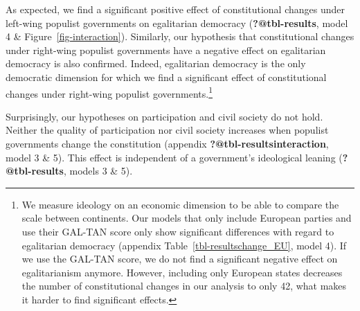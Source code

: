 \documentclass[
  abstract]{article}
\begin{document}
As expected, we find a significant positive effect of constitutional
changes under left-wing populist governments on egalitarian democracy
(\textbf{?@tbl-results}, model 4 \& Figure~\ref{fig-interaction}).
Similarly, our hypothesis that constitutional changes under right-wing
populist governments have a negative effect on egalitarian democracy is
also confirmed. Indeed, egalitarian democracy is the only democratic
dimension for which we find a significant effect of constitutional
changes under right-wing populist governments.\footnote{We measure
  ideology on an economic dimension to be able to compare the scale
  between continents. Our models that only include European parties and
  use their GAL-TAN score only show significant differences with regard
  to egalitarian democracy (appendix Table~\ref{tbl-resultschange_EU},
  model 4). If we use the GAL-TAN score, we do not find a significant
  negative effect on egalitarianism anymore. However, including only
  European states decreases the number of constitutional changes in our
  analysis to only 42, what makes it harder to find significant effects.}

Surprisingly, our hypotheses on participation and civil society do not
hold. Neither the quality of participation nor civil society increases
when populist governments change the constitution (appendix
\textbf{?@tbl-resultsinteraction}, model 3 \& 5). This effect is
independent of a government's ideological leaning
(\textbf{?@tbl-results}, models 3 \& 5).

\blandscape

\elandscape
\end{document}
